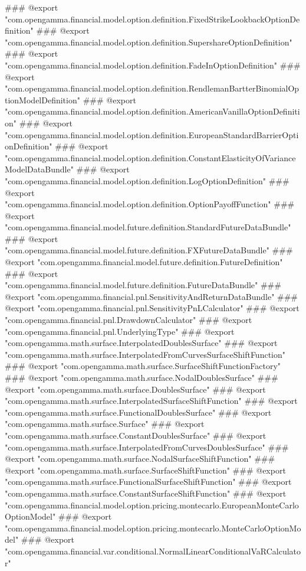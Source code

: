 ### @export "com.opengamma.financial.model.option.definition.FixedStrikeLookbackOptionDefinition"
### @export "com.opengamma.financial.model.option.definition.SupershareOptionDefinition"
### @export "com.opengamma.financial.model.option.definition.FadeInOptionDefinition"
### @export "com.opengamma.financial.model.option.definition.RendlemanBartterBinomialOptionModelDefinition"
### @export "com.opengamma.financial.model.option.definition.AmericanVanillaOptionDefinition"
### @export "com.opengamma.financial.model.option.definition.EuropeanStandardBarrierOptionDefinition"
### @export "com.opengamma.financial.model.option.definition.ConstantElasticityOfVarianceModelDataBundle"
### @export "com.opengamma.financial.model.option.definition.LogOptionDefinition"
### @export "com.opengamma.financial.model.option.definition.OptionPayoffFunction"
### @export "com.opengamma.financial.model.future.definition.StandardFutureDataBundle"
### @export "com.opengamma.financial.model.future.definition.FXFutureDataBundle"
### @export "com.opengamma.financial.model.future.definition.FutureDefinition"
### @export "com.opengamma.financial.model.future.definition.FutureDataBundle"
### @export "com.opengamma.financial.pnl.SensitivityAndReturnDataBundle"
### @export "com.opengamma.financial.pnl.SensitivityPnLCalculator"
### @export "com.opengamma.financial.pnl.DrawdownCalculator"
### @export "com.opengamma.financial.pnl.UnderlyingType"
### @export "com.opengamma.math.surface.InterpolatedDoublesSurface"
### @export "com.opengamma.math.surface.InterpolatedFromCurvesSurfaceShiftFunction"
### @export "com.opengamma.math.surface.SurfaceShiftFunctionFactory"
### @export "com.opengamma.math.surface.NodalDoublesSurface"
### @export "com.opengamma.math.surface.DoublesSurface"
### @export "com.opengamma.math.surface.InterpolatedSurfaceShiftFunction"
### @export "com.opengamma.math.surface.FunctionalDoublesSurface"
### @export "com.opengamma.math.surface.Surface"
### @export "com.opengamma.math.surface.ConstantDoublesSurface"
### @export "com.opengamma.math.surface.InterpolatedFromCurvesDoublesSurface"
### @export "com.opengamma.math.surface.NodalSurfaceShiftFunction"
### @export "com.opengamma.math.surface.SurfaceShiftFunction"
### @export "com.opengamma.math.surface.FunctionalSurfaceShiftFunction"
### @export "com.opengamma.math.surface.ConstantSurfaceShiftFunction"
### @export "com.opengamma.financial.model.option.pricing.montecarlo.EuropeanMonteCarloOptionModel"
### @export "com.opengamma.financial.model.option.pricing.montecarlo.MonteCarloOptionModel"
### @export "com.opengamma.financial.var.conditional.NormalLinearConditionalVaRCalculator"
